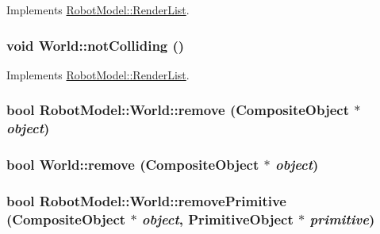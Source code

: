 Implements \hyperlink{class_robot_model_1_1_render_list_a78436c997913ce9ad41a9bd1da9b3d96}{RobotModel::RenderList}.\hypertarget{class_robot_model_1_1_world_a2300046adaa75a432476dbef1934bb01}{
\subsubsection[{notColliding}]{\setlength{\rightskip}{0pt plus 5cm}void World::notColliding ()}}
\label{class_robot_model_1_1_world_a2300046adaa75a432476dbef1934bb01}


Implements \hyperlink{class_robot_model_1_1_render_list_a78436c997913ce9ad41a9bd1da9b3d96}{RobotModel::RenderList}.\hypertarget{class_robot_model_1_1_world_a82de86617bf8c169eb12ef7369483303}{
\subsubsection[{remove}]{\setlength{\rightskip}{0pt plus 5cm}bool RobotModel::World::remove ({\bf CompositeObject} $\ast$ {\em object})}}
\label{class_robot_model_1_1_world_a82de86617bf8c169eb12ef7369483303}
\hypertarget{class_robot_model_1_1_world_a40f4e4bfed5121602f993bf561932b07}{
\subsubsection[{remove}]{\setlength{\rightskip}{0pt plus 5cm}bool World::remove ({\bf CompositeObject} $\ast$ {\em object})}}
\label{class_robot_model_1_1_world_a40f4e4bfed5121602f993bf561932b07}
\hypertarget{class_robot_model_1_1_world_a9bcebd1811fdc24fcc02ca64f37bcfaf}{
\subsubsection[{removePrimitive}]{\setlength{\rightskip}{0pt plus 5cm}bool RobotModel::World::removePrimitive ({\bf CompositeObject} $\ast$ {\em object}, \/  {\bf PrimitiveObject} $\ast$ {\em primitive})}}

